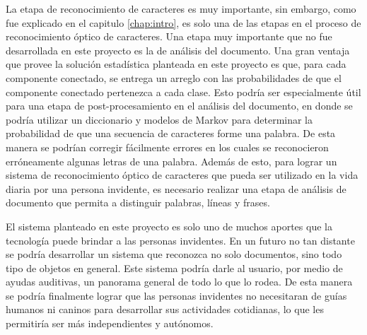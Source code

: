 \documentclass[a4paper, 11pt, oneside]{report}
\begin{document}
La etapa de reconocimiento de caracteres es muy importante, sin embargo, como fue explicado en el capitulo \ref{chap:intro}, es solo una de las etapas en el proceso de reconocimiento óptico de caracteres. Una etapa muy importante que no fue desarrollada en este proyecto es la de análisis del documento. Una gran ventaja que provee la solución estadística planteada en este proyecto es que, para cada componente conectado, se entrega un arreglo con las probabilidades de que el componente conectado pertenezca a cada clase. Esto podría ser especialmente útil para una etapa de post-procesamiento en el análisis del documento, en donde se podría utilizar un diccionario y modelos de Markov para determinar la probabilidad de que una secuencia de caracteres forme una palabra. De esta manera se podrían corregir fácilmente errores en los cuales se reconocieron erróneamente algunas letras de una palabra. Además de esto, para lograr un sistema de reconocimiento óptico de caracteres que pueda ser utilizado en la vida diaria por una persona invidente, es necesario realizar una etapa de análisis de documento que permita a distinguir palabras, líneas y frases.

El sistema planteado en este proyecto es solo uno de muchos aportes que la tecnología puede brindar a las personas invidentes. En un futuro no tan distante se podría desarrollar un sistema que reconozca no solo documentos, sino todo tipo de objetos en general. Este sistema podría darle al usuario, por medio de ayudas auditivas, un panorama general de todo lo que lo rodea. De esta manera se podría finalmente lograr que las personas invidentes no necesitaran de guías humanos ni caninos para desarrollar sus actividades cotidianas, lo que les permitiría ser más independientes y autónomos.
\end{document}
